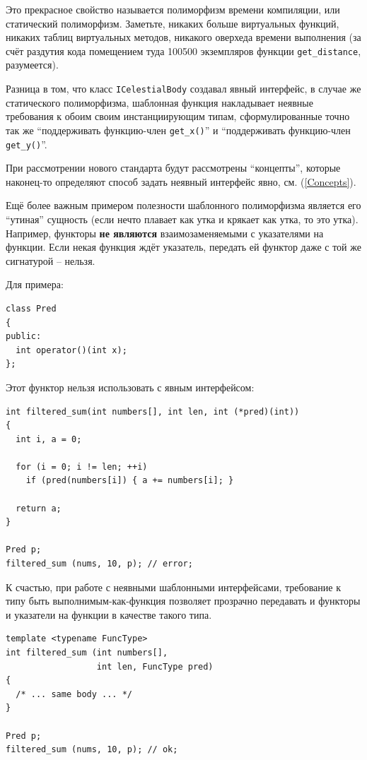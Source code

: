 \documentclass[a4paper,12pt,oneside]{article}
\begin{document}
Это прекрасное свойство называется полиморфизм времени компиляции, или статический полиморфизм. Заметьте, никаких больше виртуальных функций, никаких таблиц виртуальных методов, никакого оверхеда времени выполнения (за счёт раздутия кода помещением туда 100500 экземпляров функции \lstinline!get_distance!, разумеется).

Разница в том, что класс \lstinline!ICelestialBody! создавал явный интерфейс, в случае же статического полиморфизма, шаблонная функция накладывает неявные требования к обоим своим инстанциирующим типам, сформулированные точно так же ``поддерживать функцию-член \lstinline!get_x()!'' и ``поддерживать функцию-член \lstinline!get_y()!''. 

При рассмотрении нового стандарта будут рассмотрены ``концепты'', которые наконец-то определяют способ задать неявный интерфейс явно, см. (\ref{Concepts}).

Ещё более важным примером полезности шаблонного полиморфизма является его ``утиная'' сущность (если нечто плавает как утка и крякает как утка, то это утка). Например, функторы \textbf{не являются} взаимозаменяемыми с указателями на функции. Если некая функция ждёт указатель, передать ей функтор даже с той же сигнатурой -- нельзя. 

Для примера:

\begin{lstlisting}
class Pred
{
public:
  int operator()(int x);
};
\end{lstlisting}

Этот функтор нельзя использовать с явным интерфейсом:

\begin{lstlisting}
int filtered_sum(int numbers[], int len, int (*pred)(int))
{
  int i, a = 0;

  for (i = 0; i != len; ++i)
    if (pred(numbers[i]) { a += numbers[i]; }

  return a;
}

Pred p;
filtered_sum (nums, 10, p); // error;
\end{lstlisting}

К счастью, при работе с неявными шаблонными интерфейсами, требование к типу быть выполнимым-как-функция позволяет прозрачно передавать и функторы и указатели на функции в качестве такого типа.
 
\begin{lstlisting}
template <typename FuncType>
int filtered_sum (int numbers[], 
                  int len, FuncType pred) 
{ 
  /* ... same body ... */ 
}

Pred p;
filtered_sum (nums, 10, p); // ok;
\end{lstlisting}
\end{document}
